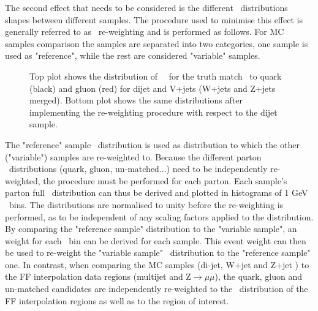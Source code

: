 	The second effect that needs to be considered is the different \pt\ distributions shapes between different samples.
	The procedure used to minimise this effect is 
	generally referred to as \pt\ re-weighting and is performed as follows. 
	For MC samples comparison the samples are separated into two categories, one sample is used as "reference", while the rest are considered "variable" samples.
\begin{figure}[!hbt]
	\begin{center}
			\hspace{0.05\textwidth}
			\medskip			 
			 \hspace{0.05\textwidth}
		\end{center}
		\caption{Top plot shows the distribution of \htau\ \pt\ for the truth match \htau\ to quark (black) and gluon (red) for dijet and V+jets (W+jets and Z+jets merged). Bottom plot shows the same distributions after implementing the re-weighting procedure with respect to the dijet sample.}
	\label{fig:pt_reweighting_comp}
	\end{figure}	
	The "reference" sample \pt\ distribution is used as distribution to which the other ("variable") samples are re-weighted to.
	Because the different parton \pt\ distributions (quark, gluon, un-matched...) need to be independently re-weighted, the procedure must be performed for each parton.
	Each sample's parton full \pt\ distribution can thus be derived and plotted in histograms of 1 GeV \pt\ bins. 
	The distributions are normalised to unity before the re-weighting is performed, as to be independent of any scaling factors applied to the distribution.
	By comparing the "reference sample" distribution to the "variable sample", an weight for each \pt\ bin can be derived for each sample. 
	This event weight can then be used to re-weight the "variable sample" \pt\ distribution to the "reference sample" one.
	In contrast, when comparing the MC samples (di-jet, W+jet and Z+jet ) to the FF interpolation data regions (multijet and Z$\rightarrow\mu\mu$), the quark, gluon and un-matched candidates are independently re-weighted to the \pt\ distribution of the FF interpolation regions as well as to the region of interest.
